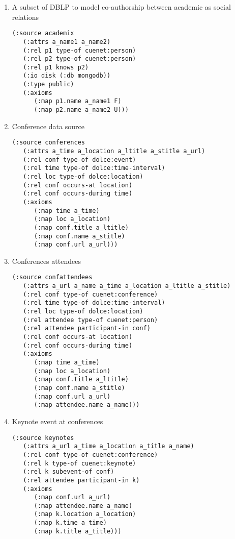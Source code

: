 \begin{enumerate}
\item A subset of DBLP to model co-authorship between academic as social relations

\begin{verbatim}
(:source academix
   (:attrs a_name1 a_name2)
   (:rel p1 type-of cuenet:person)
   (:rel p2 type-of cuenet:person)
   (:rel p1 knows p2)
   (:io disk (:db mongodb))
   (:type public)
   (:axioms
      (:map p1.name a_name1 F)
      (:map p2.name a_name2 U)))
\end{verbatim}

\item Conference data source

\begin{verbatim}
(:source conferences
   (:attrs a_time a_location a_ltitle a_stitle a_url)
   (:rel conf type-of dolce:event)
   (:rel time type-of dolce:time-interval)
   (:rel loc type-of dolce:location)
   (:rel conf occurs-at location)
   (:rel conf occurs-during time)
   (:axioms
      (:map time a_time)
      (:map loc a_location)
      (:map conf.title a_ltitle)
      (:map conf.name a_stitle)
      (:map conf.url a_url)))
\end{verbatim}

\item Conferences attendees

\begin{verbatim}
(:source confattendees
   (:attrs a_url a_name a_time a_location a_ltitle a_stitle)
   (:rel conf type-of cuenet:conference)
   (:rel time type-of dolce:time-interval)
   (:rel loc type-of dolce:location)
   (:rel attendee type-of cuenet:person)
   (:rel attendee participant-in conf)
   (:rel conf occurs-at location)
   (:rel conf occurs-during time)
   (:axioms
      (:map time a_time)
      (:map loc a_location)
      (:map conf.title a_ltitle)
      (:map conf.name a_stitle)
      (:map conf.url a_url)
      (:map attendee.name a_name)))
\end{verbatim}

\item Keynote event at conferences

\begin{verbatim}
(:source keynotes
   (:attrs a_url a_time a_location a_title a_name)
   (:rel conf type-of cuenet:conference)
   (:rel k type-of cuenet:keynote)
   (:rel k subevent-of conf)
   (:rel attendee participant-in k)
   (:axioms
      (:map conf.url a_url)
      (:map attendee.name a_name)
      (:map k.location a_location)
      (:map k.time a_time)
      (:map k.title a_title)))
\end{verbatim}


\end{enumerate}
